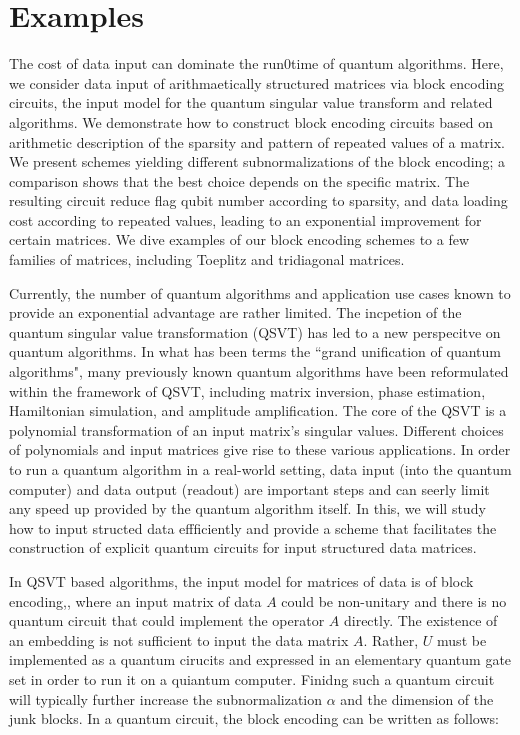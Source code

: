 \documentclass[12pt, oneside]{book}
\theoremstyle{definition}
\theoremstyle{definition}
\theoremstyle{remark}
\begin{document}
\section{Examples}
The cost of data input can dominate the run0time of quantum algorithms. Here, we consider data input of arithmaetically structured matrices via block encoding circuits, the input model for the quantum singular value transform and related algorithms. We demonstrate how to construct block encoding circuits based on arithmetic description of the sparsity and pattern of repeated values of a matrix. We present schemes yielding different subnormalizations of the block encoding; a comparison shows that the best choice depends on the specific matrix. The resulting circuit reduce flag qubit number according to sparsity, and data loading cost according to repeated values, leading to an exponential improvement for certain matrices. We dive examples of our block encoding schemes to a few families of matrices, including Toeplitz and tridiagonal matrices.

Currently, the number of quantum algorithms and application use cases known to provide an exponential advantage are rather limited. The incpetion of the quantum singular value transformation (QSVT) has led to a new perspecitve on quantum algorithms. In what has been terms the ``grand unification of quantum algorithms", many previously known quantum algorithms have been reformulated within the framework of QSVT, including matrix inversion, phase estimation, Hamiltonian simulation, and amplitude amplification. The core of the QSVT is a polynomial transformation of an input matrix's singular values. Different choices of polynomials and input matrices give rise to these various applications. In order to run a quantum algorithm in a real-world setting, data input (into the quantum computer) and data output (readout) are important steps and can seerly limit any speed up provided by the quantum algorithm itself. In this, we will study how to input structed data effficiently and provide a scheme that facilitates the construction of explicit quantum circuits for input structured data matrices.

In QSVT based algorithms, the input model for matrices of data is of block encoding,, where an input matrix of data $A$ could be non-unitary and there is no quantum circuit that could implement the operator $A$ directly. The existence of an embedding is not sufficient to input the data matrix $A$. Rather, $U$ must be implemented as a quantum cirucits and expressed in an elementary quantum gate set in order to run it on a quiantum computer. Finidng such a quantum circuit will typically further increase the subnormalization $\alpha$ and the dimension of the junk blocks. In a quantum circuit, the block encoding can be written as follows:
\end{document}
